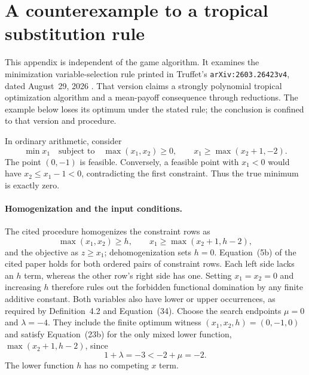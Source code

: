 \section{A counterexample to a tropical substitution rule}
\label{sec:tropical-comparison}

This appendix is independent of the game algorithm. It examines the
minimization variable-selection rule printed in Truffet's
\texttt{arXiv:2603.26423v4}, dated August~29, 2026
\cite{Truffet2026SubstitutionV4}. That version claims a strongly
polynomial tropical optimization algorithm and a mean-payoff consequence
through reductions. The example below loses its optimum under the stated
rule; the conclusion is confined to that version and procedure.

In ordinary arithmetic, consider
\begin{equation}\label{eq:substitution-example}
 \min x_1\quad\text{subject to}\quad
 \max(x_1,x_2)\ge0,\qquad x_1\ge\max(x_2+1,-2).
\end{equation}
The point $(0,-1)$ is feasible. Conversely, a feasible point with
$x_1<0$ would have $x_2\le x_1-1<0$, contradicting the first
constraint. Thus the true minimum is exactly zero.

\paragraph{Homogenization and the input conditions.}
The cited procedure homogenizes the constraint rows as
\[
 \max(x_1,x_2)\ge h,\qquad
 x_1\ge\max(x_2+1,h-2),
\]
and the objective as $z\ge x_1$; dehomogenization sets $h=0$.
Equation~(5b) of the cited paper holds for both ordered pairs of
constraint rows. Each left side lacks an $h$ term, whereas the other
row's right side has one. Setting $x_1=x_2=0$ and increasing $h$
therefore rules out the forbidden functional domination by any finite
additive constant. Both variables also have lower or upper occurrences, as required by
Definition~4.2 and Equation~(34). Choose the search endpoints
$\mu=0$ and $\lambda=-4$. They include the finite optimum witness
$(x_1,x_2,h)=(0,-1,0)$ and satisfy Equation~(23b) for the only
mixed lower function, $\max(x_2+1,h-2)$, since
\[
                 1+\lambda=-3<-2+\mu=-2.
\]
The lower function $h$ has no competing $x$ term.

